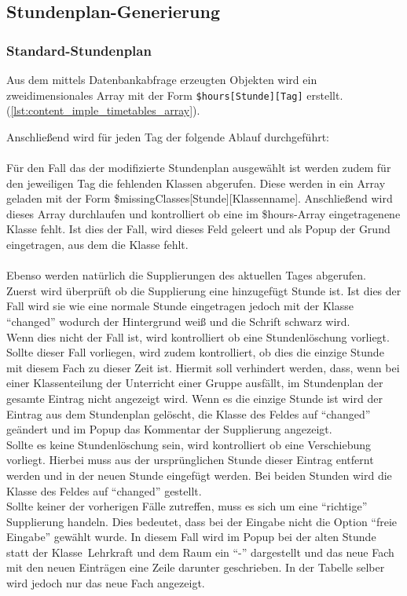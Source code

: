 \subsection{Stundenplan-Generierung}
\subsubsection{Standard-Stundenplan}
Aus dem mittels Datenbankabfrage erzeugten Objekten wird ein zweidimensionales Array mit der Form \texttt{\$hours[Stunde][Tag]} erstellt. (\autoref{lst:content_imple_timetables_array}).


Anschließend wird für jeden Tag der folgende Ablauf durchgeführt:\\\\
Für den Fall das der modifizierte Stundenplan ausgewählt ist werden zudem für den jeweiligen Tag die fehlenden Klassen abgerufen. Diese werden in ein Array geladen mit der Form \$missingClasses[Stunde][Klassenname]. Anschließend wird dieses Array durchlaufen und kontrolliert ob eine im \$hours-Array eingetragenene Klasse fehlt. Ist dies der Fall, wird dieses Feld geleert und als Popup der Grund eingetragen, aus dem die Klasse fehlt. \\\\
Ebenso werden natürlich die Supplierungen des aktuellen Tages abgerufen. \\
Zuerst wird überprüft ob die Supplierung eine hinzugefügt Stunde ist. Ist dies der Fall wird sie wie eine normale Stunde eingetragen jedoch mit der Klasse \enquote{changed} wodurch der Hintergrund weiß und die Schrift schwarz wird.\\
Wenn dies nicht der Fall ist, wird kontrolliert ob eine Stundenlöschung vorliegt. Sollte dieser Fall vorliegen, wird zudem kontrolliert, ob dies die einzige Stunde mit diesem Fach zu dieser Zeit ist. Hiermit soll verhindert werden, dass, wenn bei einer Klassenteilung der Unterricht einer Gruppe ausfällt, im Stundenplan der gesamte Eintrag nicht angezeigt wird. Wenn es die einzige Stunde ist wird der Eintrag aus dem Stundenplan gelöscht, die Klasse des Feldes auf \enquote{changed} geändert und im Popup das Kommentar der Supplierung angezeigt.\\
Sollte es keine Stundenlöschung sein, wird kontrolliert ob eine Verschiebung vorliegt. Hierbei muss aus der ursprünglichen Stunde dieser Eintrag entfernt werden und in der neuen Stunde eingefügt werden. Bei beiden Stunden wird die Klasse des Feldes auf \enquote{changed} gestellt.\\
Sollte keiner der vorherigen Fälle zutreffen, muss es sich um eine \enquote{richtige} Supplierung handeln. Dies bedeutet, dass bei der Eingabe nicht die Option \enquote{freie Eingabe} gewählt wurde. In diesem Fall wird im Popup bei der alten Stunde statt der Klasse\ Lehrkraft und dem Raum ein \enquote{-} dargestellt und das neue Fach mit den neuen Einträgen eine Zeile darunter geschrieben. In der Tabelle selber wird jedoch nur das neue Fach angezeigt.

